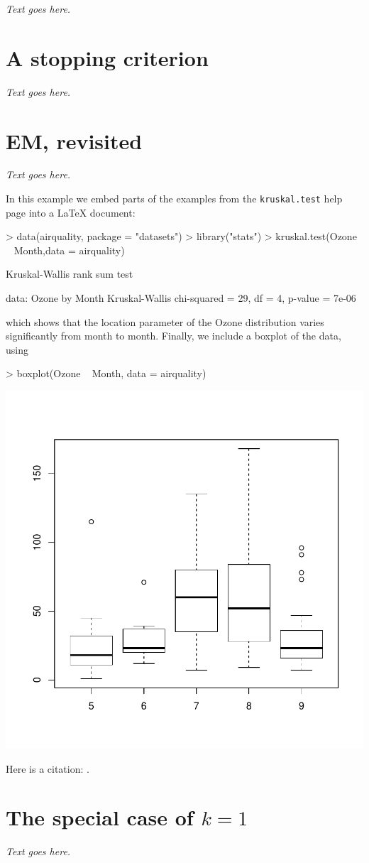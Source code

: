 \documentclass[final]{siamart171218}
\begin{document}
{\em Text goes here.}

\section{A stopping criterion}

{\em Text goes here.}

\section{EM, revisited}

{\em Text goes here.}

In this example we embed parts of the examples from the
\texttt{kruskal.test} help page into a \LaTeX{} document:
\begin{Schunk}
\begin{Sinput}
> data(airquality, package = "datasets")
> library("stats")
> kruskal.test(Ozone ~ Month,data = airquality)
\end{Sinput}
\begin{Soutput}
	Kruskal-Wallis rank sum test

data:  Ozone by Month
Kruskal-Wallis chi-squared = 29, df = 4, p-value = 7e-06
\end{Soutput}
\end{Schunk}

which shows that the location parameter of the Ozone distribution
varies significantly from month to month. Finally, we include a
boxplot of the data, using
\begin{Schunk}
\begin{Sinput}
> boxplot(Ozone ~ Month, data = airquality)
\end{Sinput}
\end{Schunk}
\begin{center} 
\includegraphics{algorithms-003}
\end{center}

Here is a citation: \cite{lee-2001}.

\appendix

\section{The special case of $k = 1$}

{\em Text goes here.}



\end{document}
